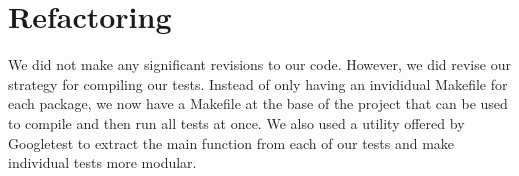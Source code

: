 \section{Refactoring}

We did not make any significant revisions to our code. However, we did revise our strategy for compiling our tests. Instead of only having an invididual Makefile for each package, we now have a Makefile at the base of the project that can be used to compile and then run all tests at once. We also used a utility offered by Googletest to extract the main function from each of our tests and make individual tests more modular.